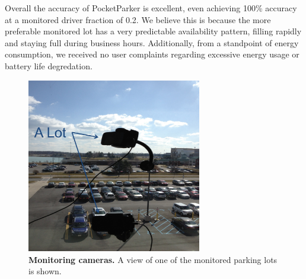 Overall the accuracy of PocketParker is excellent, even achieving 100\%
accuracy at a monitored driver fraction of 0.2. We believe this is because the
more preferable monitored lot has a very predictable availability pattern,
filling rapidly and staying full during business hours.  Additionally, from a
standpoint of energy consumption, we received no user complaints regarding
excessive energy usage or battery life degredation.


\begin{figure}[t]
\centering
\includegraphics[width=3.0in]{./figures/Camera_setting.pdf}

\caption{\textbf{Monitoring cameras.} A view of one of the monitored parking
lots is shown.}

\label{fig-camera}
\end{figure}
